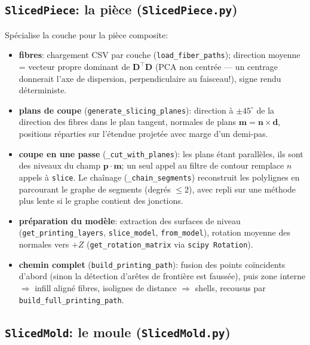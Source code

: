 \documentclass[11pt,a4paper]{article}
\begin{document}
\subsection{\texttt{SlicedPiece}: la pièce (\texttt{SlicedPiece.py})}
\label{sec:impl-piece}

Spécialise la couche pour la pièce composite:
\begin{itemize}
  \item \textbf{fibres}: chargement CSV par couche
        (\texttt{load\_fiber\_paths}); direction moyenne = vecteur
        propre dominant de $\mathbf{D}^\top\mathbf{D}$ (PCA non centrée
        --- un centrage donnerait l'axe de dispersion, perpendiculaire
        au faisceau!), signe rendu déterministe.
  \item \textbf{plans de coupe}
        (\texttt{generate\_slicing\_planes}): direction à
        $\pm45^\circ$ de la direction des fibres dans le plan tangent,
        normales de plans $\mathbf{m} = \mathbf{n} \times \mathbf{d}$,
        positions réparties sur l'étendue projetée avec marge d'un
        demi-pas.
  \item \textbf{coupe en une passe} (\texttt{\_cut\_with\_planes}): les
        plans étant parallèles, ils sont des niveaux du champ
        $\mathbf{p}\cdot\mathbf{m}$; un seul appel au filtre de contour
        remplace $n$ appels à \texttt{slice}. Le chaînage
        (\texttt{\_chain\_segments}) reconstruit les polylignes en
        parcourant le graphe de segments (degrés $\le 2$), avec repli
        sur une méthode plus lente si le graphe contient des jonctions.
  \item \textbf{préparation du modèle}: extraction des surfaces de
        niveau (\texttt{get\_printing\_layers},
        \texttt{slice\_model}, \texttt{from\_model}), rotation moyenne
        des normales vers $+Z$ (\texttt{get\_rotation\_matrix} via
        \texttt{scipy Rotation}).
  \item \textbf{chemin complet} (\texttt{build\_printing\_path}):
        fusion des points coïncidents d'abord (sinon la détection
        d'arêtes de frontière est faussée), puis zone interne
        $\Rightarrow$ infill aligné fibres, isolignes de distance
        $\Rightarrow$ shells, recousus par
        \texttt{build\_full\_printing\_path}.
\end{itemize}

\subsection{\texttt{SlicedMold}: le moule (\texttt{SlicedMold.py})}
\label{sec:impl-mold}
\end{document}
